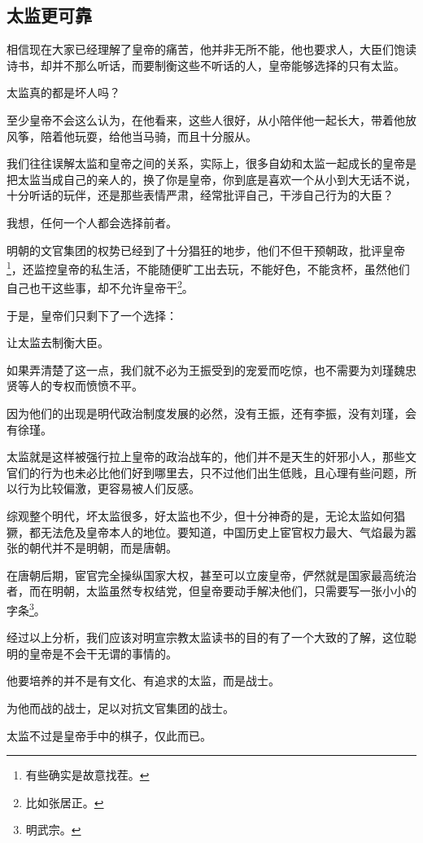 \begin{multicols}{\theparacolNo}
\subsection{太监更可靠}
相信现在大家已经理解了皇帝的痛苦，他并非无所不能，他也要求人，大臣们饱读诗书，却并不那么听话，而要制衡这些不听话的人，皇帝能够选择的只有太监。

太监真的都是坏人吗？

至少皇帝不会这么认为，在他看来，这些人很好，从小陪伴他一起长大，带着他放风筝，陪着他玩耍，给他当马骑，而且十分服从。

我们往往误解太监和皇帝之间的关系，实际上，很多自幼和太监一起成长的皇帝是把太监当成自己的亲人的，换了你是皇帝，你到底是喜欢一个从小到大无话不说，十分听话的玩伴，还是那些表情严肃，经常批评自己，干涉自己行为的大臣？

我想，任何一个人都会选择前者。

明朝的文官集团的权势已经到了十分猖狂的地步，他们不但干预朝政，批评皇帝\footnote{有些确实是故意找茬。}，还监控皇帝的私生活，不能随便旷工出去玩，不能好色，不能贪杯，虽然他们自己也干这些事，却不允许皇帝干\footnote{比如张居正。}。

于是，皇帝们只剩下了一个选择：

让太监去制衡大臣。

如果弄清楚了这一点，我们就不必为王振受到的宠爱而吃惊，也不需要为刘瑾魏忠贤等人的专权而愤愤不平。

因为他们的出现是明代政治制度发展的必然，没有王振，还有李振，没有刘瑾，会有徐瑾。

太监就是这样被强行拉上皇帝的政治战车的，他们并不是天生的奸邪小人，那些文官们的行为也未必比他们好到哪里去，只不过他们出生低贱，且心理有些问题，所以行为比较偏激，更容易被人们反感。

综观整个明代，坏太监很多，好太监也不少，但十分神奇的是，无论太监如何猖獗，都无法危及皇帝本人的地位。要知道，中国历史上宦官权力最大、气焰最为嚣张的朝代并不是明朝，而是唐朝。

在唐朝后期，宦官完全操纵国家大权，甚至可以立废皇帝，俨然就是国家最高统治者，而在明朝，太监虽然专权结党，但皇帝要动手解决他们，只需要写一张小小的字条\footnote{明武宗。}。

经过以上分析，我们应该对明宣宗教太监读书的目的有了一个大致的了解，这位聪明的皇帝是不会干无谓的事情的。

他要培养的并不是有文化、有追求的太监，而是战士。

为他而战的战士，足以对抗文官集团的战士。

太监不过是皇帝手中的棋子，仅此而已。


\end{multicols}
